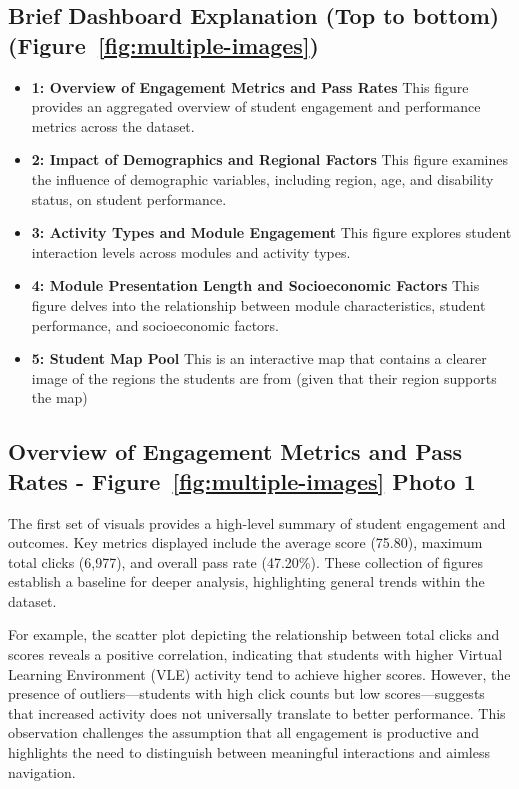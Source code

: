 \subsection*{Brief Dashboard Explanation (Top to bottom) (Figure~\ref{fig:multiple-images})}
\begin{itemize}
    \item \textbf{1: Overview of Engagement Metrics and Pass Rates} This figure provides an aggregated overview of student engagement and performance metrics across the dataset.
    
    \item \textbf{2: Impact of Demographics and Regional Factors} This figure examines the influence of demographic variables, including region, age, and disability status, on student performance.

    \item \textbf{3: Activity Types and Module Engagement} This figure explores student interaction levels across modules and activity types.

    \item \textbf{4: Module Presentation Length and Socioeconomic Factors} This figure delves into the relationship between module characteristics, student performance, and socioeconomic factors.

    \item \textbf{5: Student Map Pool} This is an interactive map that contains a clearer image of the regions the students are from (given that their region supports the map)

\end{itemize}

\subsection*{Overview of Engagement Metrics and Pass Rates - Figure~\ref{fig:multiple-images} Photo 1}

The first set of visuals provides a high-level summary of student engagement and outcomes. Key metrics displayed include the average score (75.80), maximum total clicks (6,977), and overall pass rate (47.20\%). These collection of figures establish a baseline for deeper analysis, highlighting general trends within the dataset.

For example, the scatter plot depicting the relationship between total clicks and scores reveals a positive correlation, indicating that students with higher Virtual Learning Environment (VLE) activity tend to achieve higher scores. However, the presence of outliers—students with high click counts but low scores—suggests that increased activity does not universally translate to better performance. This observation challenges the assumption that all engagement is productive and highlights the need to distinguish between meaningful interactions and aimless navigation.

